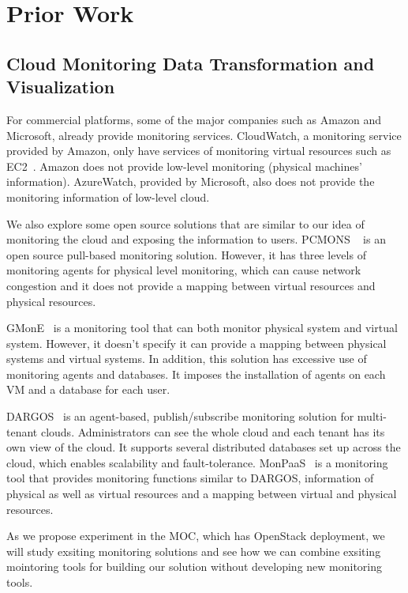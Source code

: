 

\section{Prior Work}
\label{sec:PriorWork}



\subsection{Cloud Monitoring Data Transformation and Visualization}

For commercial platforms, some of the major companies such as Amazon and Microsoft, already provide monitoring services. CloudWatch, a monitoring service provided by Amazon, only have services of monitoring virtual resources such as EC2~\cite{Aceto2013}. Amazon does not provide low-level monitoring (physical machines' information). AzureWatch, provided by Microsoft, also does not provide the monitoring information of low-level cloud. 

  We also explore some open source solutions that are similar to our idea of monitoring the cloud and exposing the information to users. PCMONS ~\cite{chaves2011toward} is an open source pull-based monitoring solution. However, it has three levels of monitoring agents for physical level monitoring, which can cause network congestion and it does not provide a mapping between virtual resources and physical resources. 

  GMonE~\cite{montes2013gmone} is a monitoring tool that can both monitor physical system and virtual system. However, it doesn't specify it can provide a mapping between physical systems and virtual systems. In addition, this solution has excessive use of monitoring agents and databases. It imposes the installation of agents on each VM and a database for each user. 

  DARGOS~\cite{povedano2013dargos}  is an agent-based, publish/subscribe monitoring solution for multi-tenant clouds. Administrators can see the whole cloud and each tenant has its own view of the cloud. It supports several distributed databases set up across the cloud, which enables scalability and fault-tolerance. MonPaaS~\cite{alcaraz2015monpaas} is a monitoring tool that provides monitoring functions similar to DARGOS, information of physical as well as virtual resources and a mapping between virtual and physical resources. 

  As we propose experiment in the MOC, which has OpenStack deployment, we will study exsiting monitoring solutions and see how we can combine exsiting mointoring tools for building our solution without developing new monitoring tools. 